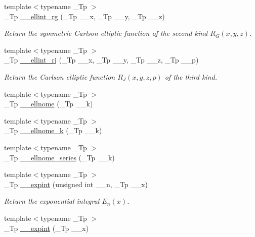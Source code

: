\begin{DoxyCompactItemize}
{\footnotesize template$<$typename \+\_\+\+Tp $>$ }\\\+\_\+\+Tp \hyperlink{namespacestd_1_1____detail_aaceff1eb320e0602afee36c60b80f87a}{\+\_\+\+\_\+ellint\+\_\+rg} (\+\_\+\+Tp \+\_\+\+\_\+x, \+\_\+\+Tp \+\_\+\+\_\+y, \+\_\+\+Tp \+\_\+\+\_\+z)
\begin{DoxyCompactList}\small\item\em Return the symmetric Carlson elliptic function of the second kind $ R_G(x,y,z) $. \end{DoxyCompactList}\item 
{\footnotesize template$<$typename \+\_\+\+Tp $>$ }\\\+\_\+\+Tp \hyperlink{namespacestd_1_1____detail_afe05ce66130b5f47389137c3f9aa6949}{\+\_\+\+\_\+ellint\+\_\+rj} (\+\_\+\+Tp \+\_\+\+\_\+x, \+\_\+\+Tp \+\_\+\+\_\+y, \+\_\+\+Tp \+\_\+\+\_\+z, \+\_\+\+Tp \+\_\+\+\_\+p)
\begin{DoxyCompactList}\small\item\em Return the Carlson elliptic function $ R_J(x,y,z,p) $ of the third kind. \end{DoxyCompactList}\item 
{\footnotesize template$<$typename \+\_\+\+Tp $>$ }\\\+\_\+\+Tp \hyperlink{namespacestd_1_1____detail_ac94c9cd28ee7973229e4a63d9b984711}{\+\_\+\+\_\+ellnome} (\+\_\+\+Tp \+\_\+\+\_\+k)
\item 
{\footnotesize template$<$typename \+\_\+\+Tp $>$ }\\\+\_\+\+Tp \hyperlink{namespacestd_1_1____detail_a7631f367a1be34f98cec2021d588457b}{\+\_\+\+\_\+ellnome\+\_\+k} (\+\_\+\+Tp \+\_\+\+\_\+k)
\item 
{\footnotesize template$<$typename \+\_\+\+Tp $>$ }\\\+\_\+\+Tp \hyperlink{namespacestd_1_1____detail_aec07b9131f90495831d349d22768425f}{\+\_\+\+\_\+ellnome\+\_\+series} (\+\_\+\+Tp \+\_\+\+\_\+k)
\item 
{\footnotesize template$<$typename \+\_\+\+Tp $>$ }\\\+\_\+\+Tp \hyperlink{namespacestd_1_1____detail_a0282700710ec07b8ca095fe2ec140d6e}{\+\_\+\+\_\+expint} (unsigned int \+\_\+\+\_\+n, \+\_\+\+Tp \+\_\+\+\_\+x)
\begin{DoxyCompactList}\small\item\em Return the exponential integral $ E_n(x) $. \end{DoxyCompactList}\item 
{\footnotesize template$<$typename \+\_\+\+Tp $>$ }\\\+\_\+\+Tp \hyperlink{namespacestd_1_1____detail_abefd4102ce8a673604204e360074ceaa}{\+\_\+\+\_\+expint} (\+\_\+\+Tp \+\_\+\+\_\+x)

\end{DoxyCompactItemize}

